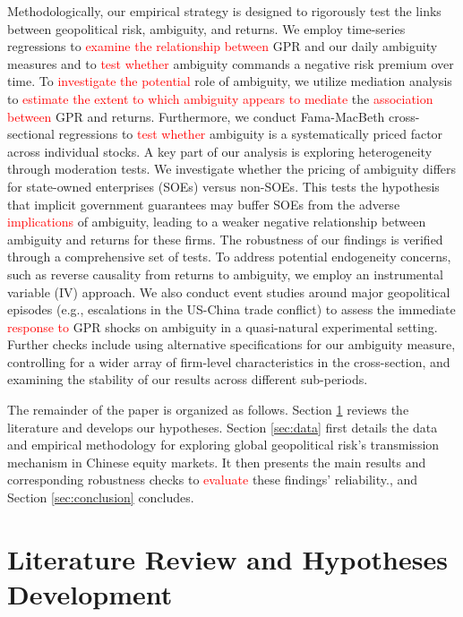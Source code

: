 \documentclass[preprint,12pt,authoryear]{elsarticle}
\begin{document}
Methodologically, our empirical strategy is designed to rigorously test the links between geopolitical risk, ambiguity, and returns. We employ time-series regressions to \textcolor{red}{examine the relationship between} GPR and our daily ambiguity measures and to \textcolor{red}{test whether} ambiguity commands a negative risk premium over time. To \textcolor{red}{investigate the potential} role of ambiguity, we utilize mediation analysis to \textcolor{red}{estimate the extent to which ambiguity appears to mediate} the \textcolor{red}{association between} GPR and returns. Furthermore, we conduct Fama-MacBeth cross-sectional regressions to \textcolor{red}{test whether} ambiguity is a systematically priced factor across individual stocks. A key part of our analysis is exploring heterogeneity through moderation tests. We investigate whether the pricing of ambiguity differs for state-owned enterprises (SOEs) versus non-SOEs. This tests the hypothesis that implicit government guarantees may buffer SOEs from the adverse \textcolor{red}{implications} of ambiguity, leading to a weaker negative relationship between ambiguity and returns for these firms. The robustness of our findings is verified through a comprehensive set of tests. To address potential endogeneity concerns, such as reverse causality from returns to ambiguity, we employ an instrumental variable (IV) approach. We also conduct event studies around major geopolitical episodes (e.g., escalations in the US-China trade conflict) to assess the immediate \textcolor{red}{response to} GPR shocks on ambiguity in a quasi-natural experimental setting. Further checks include using alternative specifications for our ambiguity measure, controlling for a wider array of firm-level characteristics in the cross-section, and examining the stability of our results across different sub-periods.

The remainder of the paper is organized as follows. Section \ref{sec:literature} reviews the literature and develops our hypotheses. Section \ref{sec:data} first details the data and empirical methodology for exploring global geopolitical risk’s transmission mechanism in Chinese equity markets. It then presents the main results and corresponding robustness checks to \textcolor{red}{evaluate} these findings’ reliability., and Section \ref{sec:conclusion} concludes.

\section{Literature Review and Hypotheses Development}
\label{sec:literature}
\end{document}

